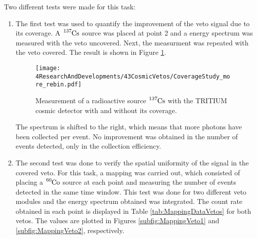 Two different tests were made for this task:
\begin{enumerate}

\item{} The first test was used to quantify the improvement of the veto signal due to its coverage. A $\ce{^{137}Cs}$ source was placed at point 2 and a energy spectrum was measured with the veto uncovered. Next, the measurment was repeated with the veto covered. The result is shown in Figure \ref{fig:VetoCoverageImprovement}.

\begin{figure}[h]
\centering
\texttt{[image: 4ResearchAndDevelopments/43CosmicVetos/CoverageStudy\_more\_rebin.pdf]}
\caption{Measurement of a radioactive source $\ce{^{137}Cs}$ with the TRITIUM cosmic detector with and without its coverage.\label{fig:VetoCoverageImprovement}}
\end{figure}

The spectrum is shifted to the right, which means that more photons have been collected per event. No improvement was obtained in the number of events detected, only in the collection efficiency.


\item{} The second test was done to verify the spatial uniformity of the signal in the covered veto. For this task, a mapping was carried out, which consisted of placing a $\ce{^{60}Co}$ source at each point and measuring the number of events detected in the same time window. This test was done for two different veto modules and the energy spectrum obtained was integrated. The count rate obtained in each point is displayed in Table \ref{tab:MappingDataVetos} for both vetos. The values are plotted in Figures \ref{subfig:MappingVeto1} and \ref{subfig:MappingVeto2}, respectively.


\end{enumerate}
